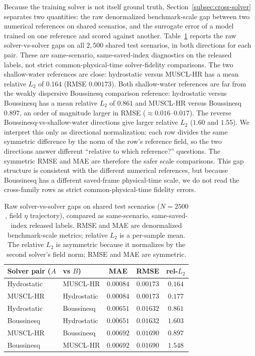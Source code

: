Because the training solver is not itself ground truth, Section~\ref{subsec:cross-solver} separates two quantities: the raw denormalized benchmark-scale gap between two numerical references on shared scenarios, and the surrogate error of a model trained on one reference and scored against another. Table~\ref{tab:solvergap} reports the raw solver-vs-solver gaps on all $2{,}500$ shared test scenarios, in both directions for each pair. These are same-scenario, same-saved-index diagnostics on the released labels, not strict common-physical-time solver-fidelity comparisons. The two shallow-water references are close: hydrostatic versus MUSCL-HR has a mean relative $L_2$ of $0.164$ (RMSE $0.00173$). Both shallow-water references are far from the weakly dispersive Boussinesq comparison reference: hydrostatic versus Boussinesq has a mean relative $L_2$ of $0.861$ and MUSCL-HR versus Boussinesq $0.897$, an order of magnitude larger in RMSE ($\approx 0.016$--$0.017$). The reverse Boussinesq-vs-shallow-water directions give larger relative $L_2$ ($1.60$ and $1.55$). We interpret this only as directional normalization: each row divides the same symmetric difference by the norm of the row's reference field, so the two directions answer different ``relative to which reference?'' questions. The symmetric RMSE and MAE are therefore the safer scale comparisons. This gap structure is consistent with the different numerical references, but because Boussinesq has a different saved-frame physical-time scale, we do not read the cross-family rows as strict common-physical-time fidelity errors.

\begin{table}[!htbp]
\centering
\caption{Raw solver-vs-solver gaps on shared test scenarios ($N = 2500$, field $\eta$ trajectory), compared as same-scenario, same-saved-index released labels. RMSE and MAE are denormalized benchmark-scale metrics; relative $L_2$ is a per-sample mean. The relative $L_2$ is asymmetric because it normalizes by the second solver's field norm; RMSE and MAE are symmetric.}
\label{tab:solvergap}
\begin{tabular}{llccc}
    \toprule
    Solver pair ($A$ & vs $B$) & MAE & RMSE & rel-$L_2$ \\
    \midrule
    Hydrostatic & MUSCL-HR    & $0.00084$ & $0.00173$ & $0.164$ \\
    MUSCL-HR    & Hydrostatic & $0.00084$ & $0.00173$ & $0.177$ \\
    Hydrostatic & Boussinesq  & $0.00651$ & $0.01632$ & $0.861$ \\
    Boussinesq  & Hydrostatic & $0.00651$ & $0.01632$ & $1.603$ \\
    MUSCL-HR    & Boussinesq  & $0.00692$ & $0.01690$ & $0.897$ \\
    Boussinesq  & MUSCL-HR    & $0.00692$ & $0.01690$ & $1.548$ \\
    \bottomrule
\end{tabular}
\end{table}

